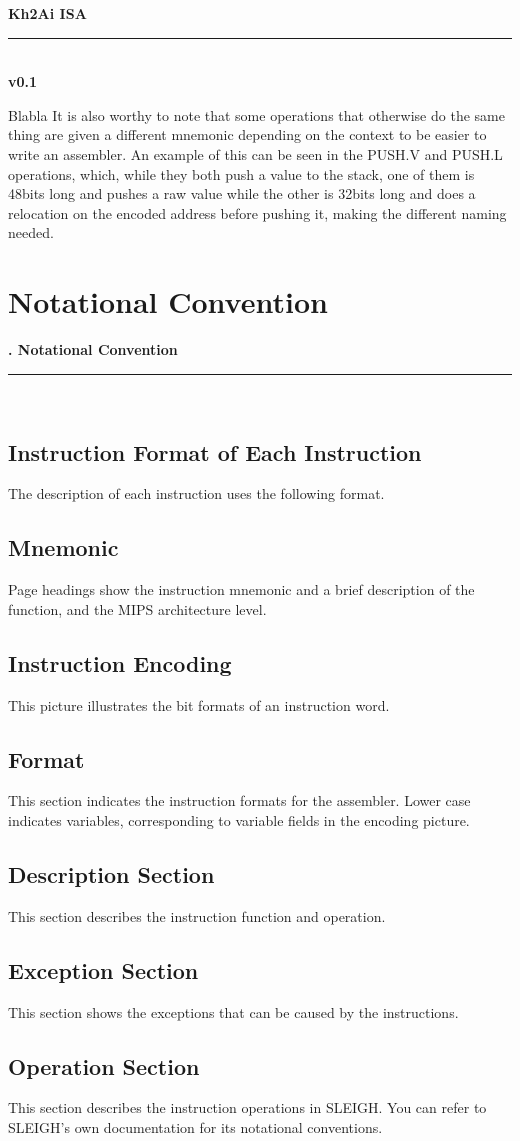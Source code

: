 \documentclass[openany,oneside]{memoir}
\newcommand\version{v0.1}
\newcommand{\Line}{\rule{\linewidth}{1.0mm}}
\newcommand{\Chapter}[1]{
\pagestyle{fancy}
\chapter{#1}
\begin{vplace}[0.7]
{\Huge   \null\hfill{\textbf{\thechapter.  #1}}} \\
\Line \\
\end{vplace} 
\newpage
}
\newcommand{\Main}[2]{
\begin{vplace}[0.7]
{\Huge   \null\hfill{\textbf{#1}}} \\
\Line \\
\huge \null\hfill \textbf{#2}
\end{vplace}
\newpage
}
\begin{document}
\Main{Kh2Ai ISA}{\version}

Blabla 
It is also worthy to note that some operations that otherwise do the same thing
are given a different mnemonic depending on the context to be easier to write an
assembler. An example of this can be seen in the PUSH.V and PUSH.L operations,
which, while they both push a value to the stack, one of them is 48bits long and
pushes a raw value while the other is 32bits long and does a relocation on the
encoded address before pushing it, making the different naming needed.

\Chapter{Notational Convention}

\section{Instruction Format of Each Instruction} 
The description of each instruction uses the following format. 

\section{Mnemonic}
Page headings show the instruction mnemonic and a brief description of the function, and the MIPS architecture level.
\section{Instruction Encoding} 
This picture illustrates the bit formats of an instruction word. 
\section{Format} 
This section indicates the instruction formats for the assembler. Lower case indicates variables, corresponding to variable fields in the encoding picture. 
\section{Description Section} 
This section describes the instruction function and operation. 
\section{Exception Section} 
This section shows the exceptions that can be caused by the instructions. 
\section{Operation Section}
This section describes the instruction operations in SLEIGH. You can refer to SLEIGH's own documentation for its notational conventions.
\end{document}
